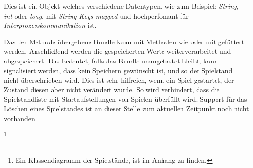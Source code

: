 \begin{infobox}[frametitle=Bundle]
Dies ist ein Objekt welches verschiedene Datentypen, wie zum Beispiel:
\emph{String, int} oder \emph{long}, mit \emph{String-Keys mapped} und hochperfomant
für \emph{Interprozesskommunikation} ist.
\end{infobox}

Das der Methode  übergebene Bundle kann mit Methoden wie
 oder  mit gefüttert werden.
Anschließend werden die gespeicherten Werte weiterverarbeitet und
abgespeichert. Das bedeutet, falls das Bundle unangetastet bleibt, kann
signalisiert werden, dass kein Speichern gewünscht ist, und so der Spielstand
nicht überschrieben wird. Dies ist sehr hilfreich, wenn ein Spiel gestartet,
der Zustand diesen aber nicht verändert wurde. So wird verhindert, dass die
Spielstandliste mit Startaufstellungen von Spielen überfüllt wird. Support für
das Löschen eines Spielstandes ist an dieser Stelle zum aktuellen Zeitpunkt
noch nicht vorhanden.

\let\thefootnote\relax\footnote{Ein Klassendiagramm der Spielstände, ist im Anhang zu finden.}